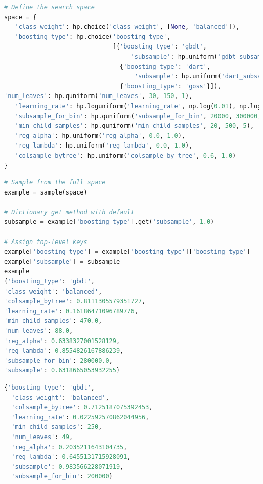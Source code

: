 \documentclass{apmcmthesis}
\begin{document}
\begin{lstlisting}[language=python,caption={Definition of domain}]
# Define the search space
space = {
   'class_weight': hp.choice('class_weight', [None, 'balanced']),
   'boosting_type': hp.choice('boosting_type',
                              [{'boosting_type': 'gbdt',
                                   'subsample': hp.uniform('gdbt_subsample', 0.5, 1)},
                                {'boosting_type': 'dart',
                                    'subsample': hp.uniform('dart_subsample', 0.5, 1)},
                                {'boosting_type': 'goss'}]),
'num_leaves': hp.quniform('num_leaves', 30, 150, 1),
   'learning_rate': hp.loguniform('learning_rate', np.log(0.01), np.log(0.2)),
   'subsample_for_bin': hp.quniform('subsample_for_bin', 20000, 300000, 20000),
   'min_child_samples': hp.quniform('min_child_samples', 20, 500, 5),
   'reg_alpha': hp.uniform('reg_alpha', 0.0, 1.0),
   'reg_lambda': hp.uniform('reg_lambda', 0.0, 1.0),
   'colsample_bytree': hp.uniform('colsample_by_tree', 0.6, 1.0)
}
 \end{lstlisting}
\begin{lstlisting}[language=python,caption={Sample from the full space}]
# Sample from the full space
example = sample(space)

# Dictionary get method with default
subsample = example['boosting_type'].get('subsample', 1.0)

# Assign top-level keys
example['boosting_type'] = example['boosting_type']['boosting_type']
example['subsample'] = subsample
example
{'boosting_type': 'gbdt',
'class_weight': 'balanced',
'colsample_bytree': 0.8111305579351727,
'learning_rate': 0.16186471096789776,
'min_child_samples': 470.0,
'num_leaves': 88.0,
'reg_alpha': 0.6338327001528129,
'reg_lambda': 0.8554826167886239,
'subsample_for_bin': 280000.0,
'subsample': 0.6318665053932255}
 \end{lstlisting}
\begin{lstlisting}[language=python,caption={Return result of super parameter}]
{'boosting_type': 'gbdt',
  'class_weight': 'balanced',
  'colsample_bytree': 0.7125187075392453,
  'learning_rate': 0.022592570862044956,
  'min_child_samples': 250,
  'num_leaves': 49,
  'reg_alpha': 0.2035211643104735,
  'reg_lambda': 0.6455131715928091,
  'subsample': 0.983566228071919,
  'subsample_for_bin': 200000}
 \end{lstlisting}
\end{document}
